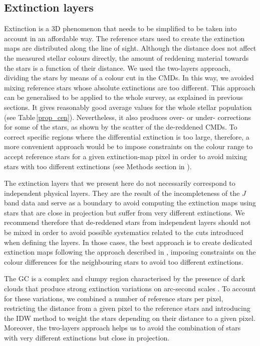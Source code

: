 \documentclass{aa}
\begin{document}
\subsection{Extinction layers}


Extinction is a 3D phenomenon that needs to be simplified to be taken into account in an affordable way. The reference stars used to create the extinction maps are distributed along the line of sight. Although the distance does not affect the measured stellar colours directly, the amount of reddening material towards the stars is a function of their distance. We used the two-layers approach, dividing the stars by means of a colour cut in the CMDs. In this way, we avoided mixing reference stars whose absolute extinctions are too different. This approach can be generalised to be applied to the whole survey, as explained in previous sections. It gives reasonably good average values for the whole stellar population (see Table\,\ref{prop_cen}). Nevertheless, it also produces over- or under- corrections for some of the stars, as shown by the scatter of the de-reddened CMDs. To correct specific regions where the differential extinction is too large, therefore, a more convenient approach would be to impose constraints on the colour range to accept reference stars for a given extinction-map pixel in order to avoid mixing stars with too different extinctions (see Methods section in \citealt{Nogueras-Lara:2019ad}).


The extinction layers that we present here do not necessarily correspond to independent physical layers. They are the result of the incompleteness of the $J$ band data and serve as a boundary to avoid computing the extinction maps using stars that are  close in projection but suffer from very different extinctions. We recommend therefore that de-reddened stars from independent layers should not be mixed in order to avoid possible systematics related to the cuts introduced when defining the layers. In those cases, the best approach is to create  dedicated extinction maps following the approach described in \citet{Nogueras-Lara:2019ad}, imposing constraints on the colour differences for the neighbouring stars to avoid too different extinctions.  


The GC is a complex and clumpy region characterised by the presence of dark clouds that produce strong extinction variations on arc-second scales \citep[e.g.][]{Launhardt:2002nx,Nogueras-Lara:2018aa,Battersby:2020vt}. To account for these variations, we combined a number of reference stars per pixel, restricting the distance from a given pixel to the reference stars and introducing the IDW method to weight the stars depending on their distance to a given pixel. Moreover, the two-layers approach helps us to avoid the combination of stars with very different extinctions but close in projection.
\end{document}
